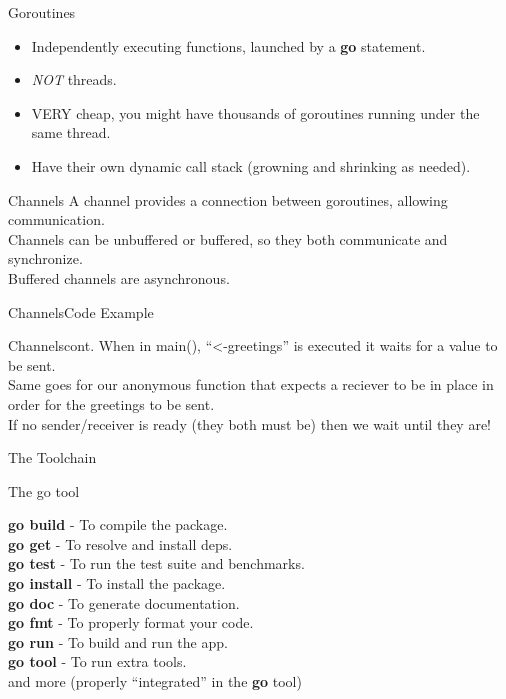 \documentclass{beamer}
\begin{document}
    \begin{frame}{Goroutines}
        \begin{itemize}
            \item Independently executing functions, launched by a {\bf go} statement. 
            \item \emph{ {\color{red}NOT}} threads.
            \item VERY cheap, you might have thousands of goroutines running
                under the same thread.
            \item Have their own dynamic call stack (growning and shrinking as needed).
        \end{itemize}
    \end{frame}

    \begin{frame}{Channels}
        A channel provides a connection between goroutines, allowing communication.\\
        Channels can be unbuffered or buffered, so they both communicate and synchronize.\\
        Buffered channels are asynchronous.
    \end{frame}

    \begin{frame}{Channels}{Code Example}
        
    \end{frame}

    \begin{frame}{Channels}{cont.}
        When in main(), ``\textless-greetings'' is executed it waits for a value to be sent.\\
        Same goes for our anonymous function that expects a reciever to be in place
        in order for the greetings to be sent.\\
        If no sender/receiver is ready (they both must be) then we wait until they are!
    \end{frame}

    \begin{frame}
        \center\huge The Toolchain
    \end{frame}

    \begin{frame}{The go tool}

        {\bf go build} - To compile the package.\\
        {\bf go get} - To resolve and install deps.\\
        {\bf go test} - To run the test suite and benchmarks.\\
        {\bf go install} - To install the package.\\
        {\bf go doc} - To generate documentation.\\
        {\bf go fmt} - To properly format your code.\\
        {\bf go run} - To build and run the app.\\
        {\bf go tool} - To run extra tools.\\
        and more (properly ``integrated'' in the {\bf go} tool)

    \end{frame}
\end{document}
